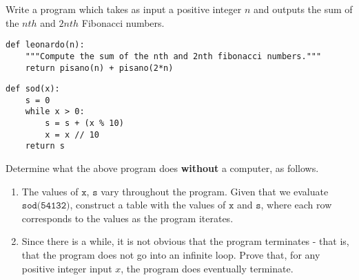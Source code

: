 \documentclass[10pt,twoside]{amsart}
\begin{document}
\begin{exercises}
        \begin{exercise}Write a program which takes as input a positive integer $n$ and outputs the sum of the $nth$ and $2nth$ Fibonacci numbers.
        \end{exercise}


    \begin{minipage}{\textwidth}
        \begin{lstlisting}
def leonardo(n):
    """Compute the sum of the nth and 2nth fibonacci numbers."""
    return pisano(n) + pisano(2*n)
        \end{lstlisting}
    \end{minipage}

    \begin{minipage}{\textwidth}
        \begin{lstlisting}
def sod(x):
    s = 0
    while x > 0:
        s = s + (x % 10)
        x = x // 10
    return s
        \end{lstlisting}
    \end{minipage}
        
        \begin{exercise}
            Determine what the above program does \textbf{without} a computer, as
            follows.
            \begin{enumerate}[label=(\alph*)]    
                \item The values of $\texttt{x}$, $\texttt{s}$ vary throughout the program. Given that we evaluate $\texttt{sod(54132)}$, construct a table with the values of $\texttt{x}$ and $\texttt{s}$, where each row corresponds to the values as the program iterates.
                    

                \item Since there is a while, it is not obvious that the program terminates - that is, that the program does not go into an infinite loop. Prove that, for any positive integer input $x$, the program does eventually terminate.
                      

\end{enumerate}
\end{exercise}
\end{exercises}
\end{document}
